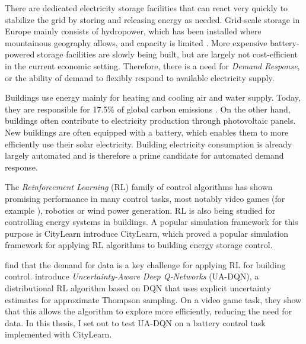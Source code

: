 There are dedicated electricity storage facilities that can react very quickly to stabilize the grid by storing and releasing energy as needed.
Grid-scale storage in Europe mainly consists of hydropower, which has been installed where mountainous geography allows, and capacity is limited \cite{gimeno-gutierrez2015AssessmentEuropeanPotential}.
More expensive battery-powered storage facilities are slowly being built, but are largely not cost-efficient in the current economic setting.
Therefore, there is a need for \emph{Demand Response}, or the ability of demand to flexibly respond to available electricity supply.

Buildings use energy mainly for heating and cooling air and water supply.
Today, they are responsible for 17.5\% of global carbon emissions \cite{ritchie2020COGreenhouseGas}.
On the other hand, buildings often contribute to electricity production through photovoltaic panels. New buildings are often equipped with a battery, which enables them to more efficiently use their solar electricity.
Building electricity consumption is already largely automated and is therefore a prime candidate for automated demand response.

The \emph{Reinforcement Learning} (RL) family of control algorithms has shown promising performance in many control tasks, most notably video games (for example \cite{mnih2015HumanlevelControlDeep}), robotics \citep{latifi2020ModelFreeControlDynamicField} or wind power generation.%
RL is also being studied for controlling energy systems in buildings.
A popular simulation framework for this purpose is CityLearn \cite{vazquez-canteli2020CityLearnStandardizingResearch} introduce CityLearn, which proved a popular simulation framework for applying RL algorithms to building energy storage control.

\cite{wang2020ReinforcementLearningBuilding} find that the demand for data is a key challenge for applying RL for building control.
\cite{clements2020EstimatingRiskUncertainty} introduce \emph{Uncertainty-Aware Deep Q-Networks} (UA-DQN), a distributional RL algorithm based on DQN \citep{mnih2015HumanlevelControlDeep} that uses explicit uncertainty estimates for approximate Thompson sampling.
On a video game task, they show that this allows the algorithm to explore more efficiently, reducing the need for data.
In this thesis, I set out to test UA-DQN on a battery control task implemented with CityLearn.

